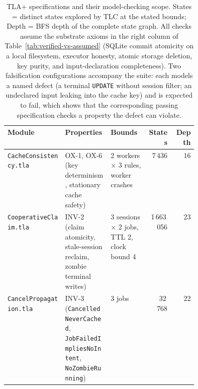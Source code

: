 \documentclass[12pt,a4paper]{article}
\newcommand{\code}[1]{{\texttt{\small\color{inlinecode}#1}}}
\begin{document}
\begin{table}[htbp]
\centering\small\setlength{\tabcolsep}{4pt}
\begin{tabular}{@{}lp{0.24\linewidth}p{0.20\linewidth}rr@{}}
\toprule
\textbf{Module} & \textbf{Properties} & \textbf{Bounds} & \textbf{States} & \textbf{Depth} \\
\midrule
\code{Cache\allowbreak Consistency.tla}  & OX-1, OX-6 (key determinism, stationary cache safety) & 2 workers $\times$ 3 rules, worker crashes & 7\,436 & 16 \\
\addlinespace
\code{Cooperative\allowbreak Claim.tla}  & INV-2 (claim atomicity, stale-session reclaim, zombie terminal writes) & 3 sessions $\times$ 2 jobs, TTL 2, clock bound 4 & 1\,663\,056 & 23 \\
\addlinespace
\code{Cancel\allowbreak Propagation.tla} & INV-3 (\code{Cancelled\allowbreak Never\allowbreak Cached},
  \code{Job\allowbreak Failed\allowbreak Implies\allowbreak No\allowbreak Intent},
  \code{No\allowbreak Zombie\allowbreak Running}) & 3 jobs & 32\,768 & 22 \\
\bottomrule
\end{tabular}
\caption{TLA+ specifications and their model-checking scope. States =
  distinct states explored by TLC at the stated bounds; Depth = BFS
  depth of the complete state graph. All checks assume the substrate
  axioms in the right column of Table~\ref{tab:verified-vs-assumed}
  (SQLite commit atomicity on a local filesystem, executor honesty,
  atomic storage deletion, key purity, and input-declaration
  completeness). Two falsification configurations accompany the suite:
  each models a named defect (a terminal \code{UPDATE} without session
  filter; an undeclared input leaking into the cache key) and is
  expected to fail, which shows that the corresponding passing
  specification checks a property the defect can violate.}
\label{tab:tla-specs}
\end{table}

\clearpage

{          %

}
\end{document}
